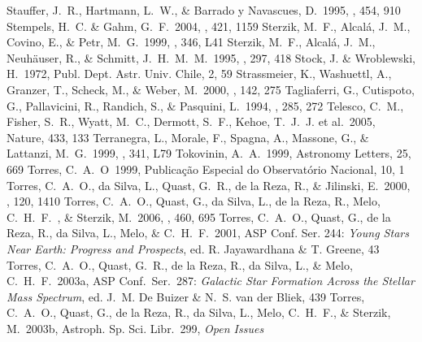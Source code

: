 \documentclass[11pt,twoside]{book}
\begin{document}
\begin{thebibliography}{}
Stauffer, J.~R., Hartmann, L.~W., \& Barrado y Navascues, D.\ 1995, \apj, 454, 910
{Stempels}, H.~C. \& {Gahm}, G.~F.\ 2004, \aap, 421, {1159}
Sterzik, M.~F., Alcal{\'a}, J.~M., Covino, E., \& Petr, M.~G.\ 1999, \aap, 346, L41
Sterzik, M.~F., Alcal{\'a}, J.~M., Neuh{\"a}user, R., \& Schmitt, J.~H.~M.~M.\ 1995, \aap, 297, 418
Stock, J. \& Wroblewski, H.\ 1972, Publ. Dept. Astr. Univ. Chile, 2, 59
Strassmeier, K., Washuettl, A., Granzer, T., Scheck, M., \& Weber, M.\ 2000, \aaps, 142, 275
Tagliaferri, G., Cutispoto, G., Pallavicini, R., Randich, S., \& Pasquini, L.\ 1994, \aap, 285, 272
Telesco, C.~M., Fisher, S.~R., Wyatt, M.~C., {Dermott}, S.~F., {Kehoe}, T.~J.~J.
et al.\ 2005, Nature, 433, 133
Terranegra, L., Morale, F., Spagna, A., Massone, G., \& Lattanzi, M.~G.\ 1999, \aap, 341, L79
Tokovinin, A.~A.\ 1999, Astronomy Letters, 25, 669
Torres, C.~A.~O\ 1999, Publica\c c\~ao Especial do Observat\'{o}rio Nacional, 10, 1
Torres, C.~A.~O., da Silva, L., Quast, G.~R., de la Reza, R., \& Jilinski, E.\ 2000, \aj, 120, 1410
Torres, C.~A.~O., Quast, G., da Silva, L., de la Reza, R., Melo, C.~H.~F.~, \& Sterzik, M.\ 2006, \aap, 460, 695
{Torres}, C.~A.~O., {Quast}, G., {de la Reza}, R., {da Silva}, L., {Melo}, \&
C.~H.~F.\ 2001, ASP Conf. Ser. 244: {\it Young Stars Near Earth: Progress and
Prospects}, ed. R. {Jayawardhana} \& T. {Greene}, 43
Torres, C.~A.~O., Quast, G.~R., de la Reza, R., da Silva, L., \& Melo, C.~H.~F.\
2003a, ASP  Conf.~Ser.~287: {\it Galactic Star Formation Across the Stellar Mass
Spectrum}, ed. J.~M. {De Buizer} \& N.~S. {van der Bliek},  439
{Torres}, C.~A.~O., {Quast}, G., {de la Reza}, R., {da Silva}, L., {Melo},
C.~H.~F., \& {Sterzik}, M.\ 2003b, Astroph. Sp. Sci. Libr.~299, {\it Open Issues
}
\end{thebibliography}
\end{document}
